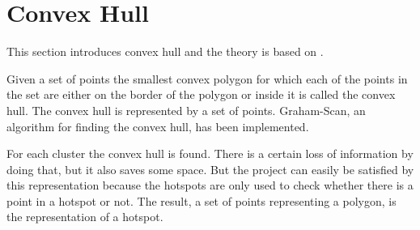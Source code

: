 \section{Convex Hull}\label{convex_hull}
This section introduces convex hull and the theory is based on \citet[section 33.3]{aadbook}.

Given a set of points the smallest convex polygon for which each of the points in the set are either on the border of the polygon or inside it is called the convex hull. \cite[33.1-5]{aadbook}
The convex hull is represented by a set of points.
Graham-Scan\cite[page 1031]{aadbook}, an algorithm for finding the convex hull, has been implemented.


For each cluster the convex hull is found.
There is a certain loss of information by doing that, but it also saves some space.
But the project can easily be satisfied by this representation because the hotspots are only used to check whether there is a point in a hotspot or not.
The result, a set of points representing a polygon, is the representation of a hotspot.
